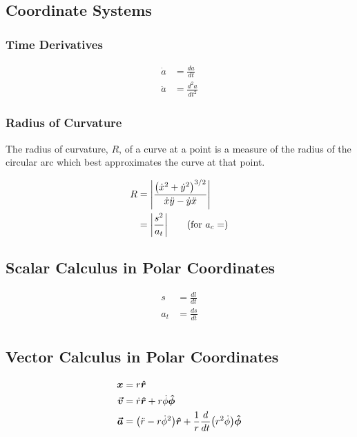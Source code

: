\subsection{Coordinate Systems\label{sec:notation}} 

\subsubsection{Time Derivatives}

\begin{align*}
\dot{a}& = \frac{da}{dt}\\
%
\ddot{a}& = \frac{d^2a}{dt^2}
\end{align*}

\subsubsection{Radius of Curvature}

The radius of curvature, $R$, of a curve at a point is a measure of the radius of the circular arc which best approximates the curve at that point.

\begin{align}
R& = \abs{\frac{\paren{\dot{x}^2 + \dot{y}^2}^{3/2}}{\dot{x}\ddot{y} - \dot{y}{\ddot{x}}}}\\
%
&= \abs{\frac{s^2}{a_t}}\tag{for $a_c = $}
\end{align}

\subsection{Scalar Calculus in Polar Coordinates}

\begin{align}
s& = \frac{dl}{dt}\\
%
a_t& = \frac{ds}{dt}\\
\end{align}

\subsection{Vector Calculus in Polar Coordinates}

\begin{align}
\boldsymbol{x}& = r \boldsymbol{\hat{r}}\\
%
\boldsymbol{\vec{v}}& = \dot{r} \boldsymbol{\hat{r}} + r \dot{\phi} \boldsymbol{\hat{\phi}}\\
%
\label{eq:a_vec_def}\boldsymbol{\vec{a}}& = \paren{\ddot{r} - r \dot{\phi}^2} \boldsymbol{\hat{r}} + \frac{1}{r} \frac{d}{dt} \paren{r^2 \dot{\phi}} \boldsymbol{\hat{\phi}}
\end{align}

